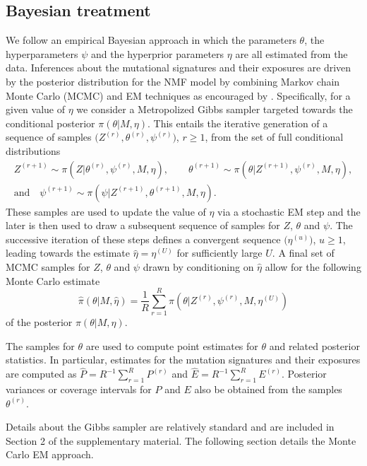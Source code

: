 \documentclass{bioinfo}
\begin{document}
\subsection{Bayesian treatment}
We follow an empirical Bayesian approach in which the parameters
$\theta$, the hyperparameters $\psi$ and the hyperprior parameters
$\eta$ are all estimated from the data.  Inferences about the
mutational signatures and their exposures are driven by the
posterior distribution for the NMF model by combining
Markov chain Monte Carlo (MCMC) and EM techniques as encouraged by
\cite{C01}. Specifically, for a given value of $\eta$ we consider a
Metropolized Gibbs sampler targeted towards the conditional posterior
$\pi(\theta|M, \eta)$. This entails the iterative generation of a
sequence of samples $\big(Z^{(r)}, \theta^{(r)}, \psi^{(r)}\big)$, $r
\geqslant 1$, from the set of full conditional distributions
\begin{gather*}
   Z^{(r+1)} \sim \pi(Z| \theta^{(r)}, \psi^{(r)}, M, \eta), \qquad
   \theta^{(r+1)} \sim \pi(\theta| Z^{(r+1)}, \psi^{(r)}, M, \eta), \\
       \text{and}\quad
   \psi^{(r+1)} \sim \pi(\psi| Z^{(r+1)}, \theta^{(r+1)}, M, \eta).
\end{gather*}
These samples are used to update the value of $\eta$ via a stochastic
EM step and the later is then used to draw a subsequent sequence of
samples for $Z$, $\theta$ and $\psi$. The successive iteration of
these steps defines a convergent sequence $\big(\eta^{(u)}\big)$, $u
\geq 1$, leading towards the estimate $\hat\eta = \eta^{(U)}$ for
sufficiently large $U$. A final set of MCMC samples for $Z$, $\theta$
and $\psi$ drawn by conditioning on $\hat\eta$ allow for the following
Monte Carlo estimate
\begin{equation}
 \label{eqn:MCEM_estimate}
   \widehat{\pi}(\theta|M, \hat\eta)
 = 
   \frac{1}{R}\sum_{r=1}^R \pi(\theta|Z^{(r)}, \psi^{(r)}, M,
   \eta^{(U)})
\end{equation}
of the posterior $\pi(\theta|M, \eta)$.


The samples for $\theta$ are used to compute point estimates for
$\theta$ and related posterior statistics. In particular, estimates
for the mutation signatures and their exposures are computed as
$\widehat P = R^{-1}\sum_{r=1}^R P^{(r)}$ and $\widehat E =
R^{-1}\sum_{r=1}^R E^{(r)}$. Posterior variances or coverage intervals
for $P$ and $E$ also be obtained from the samples $\theta^{(r)}$. 


Details about the Gibbs sampler are relatively standard and are
included in Section 2 of the supplementary material. The following
section details the Monte Carlo EM approach.
\end{document}
